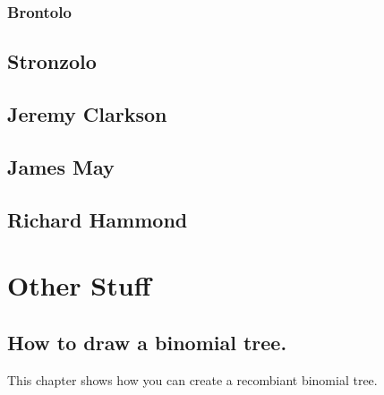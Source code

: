 \documentclass{article}
\begin{document}
\subsection{Brontolo}
\section{Stronzolo}
\section{Jeremy Clarkson}
\section{James May}
\section{Richard Hammond}

\chapter{Other Stuff}

\section{How to draw a binomial tree.}
This chapter shows how you can create a recombiant binomial tree. 
\end{document}
